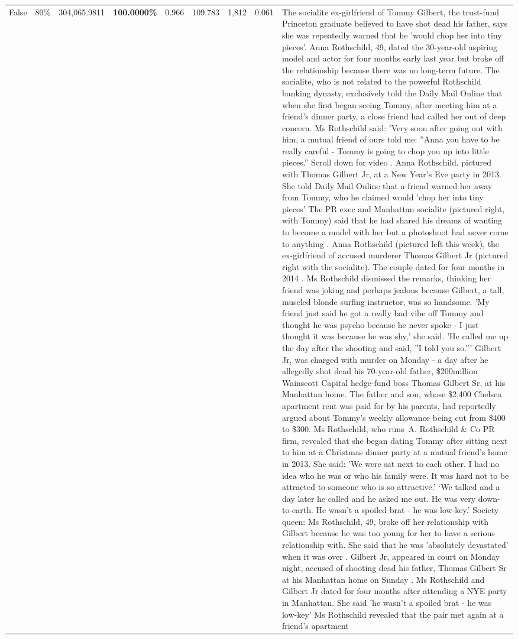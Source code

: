 \begin{table}[H]
\begin{tabular}{lllrlllll}
False & 80\% & \color{red} 304,065.9811 & \bfseries \color{red} 100.0000\% & 0.966 & 109.783 & 1,812 & 0.061 & The socialite ex-girlfriend of Tommy Gilbert, the trust-fund Princeton graduate believed to have shot dead his father, says she was repeatedly warned that he 'would chop her into tiny pieces'. Anna Rothschild, 49, dated the 30-year-old aspiring model and actor for four months early last year but broke off the relationship because there was no long-term future. The socialite, who is not related to the powerful Rothschild banking dynasty, exclusively told the Daily Mail Online that when she first began seeing Tommy, after meeting him at a friend's dinner party, a close friend had called her out of deep concern. Ms Rothschild said: 'Very soon after going out with him, a mutual friend of ours told me: ''Anna you have to be really careful - Tommy is going to chop you up into little pieces.'' Scroll down for video . Anna Rothschild, pictured with Thomas Gilbert Jr, at a New Year's Eve party in 2013. She told Daily Mail Online that a friend warned her away from Tommy, who he claimed would 'chop her into tiny pieces' The PR exec and Manhattan socialite (pictured right, with Tommy) said that he had shared his dreams of wanting to become a model with her but a photoshoot had never come to anything . Anna Rothschild (pictured left this week), the ex-girlfriend of accused murderer Thomas Gilbert Jr (pictured right with the socialite). The couple dated for four months in 2014 . Ms Rothschild dismissed the remarks, thinking her friend was joking and perhaps jealous because Gilbert, a tall, muscled blonde surfing instructor, was so handsome. 'My friend just said he got a really bad vibe off Tommy and thought he was psycho because he never spoke - I just thought it was because he was shy,' she said. 'He called me up the day after the shooting and said, ''I told you so.''' Gilbert Jr, was charged with murder on Monday - a day after he allegedly shot dead his 70-year-old father, \$200million Wainscott Capital hedge-fund boss Thomas Gilbert Sr, at his Manhattan home. The father and son, whose \$2,400 Chelsea apartment rent was paid for by his parents, had reportedly argued about Tommy's weekly allowance being cut from \$400 to \$300. Ms Rothschild, who runs A. Rothschild \& Co PR firm, revealed that she began dating Tommy after sitting next to him at a Christmas dinner party at a mutual friend's home in 2013. She said: 'We were sat next to each other. I had no idea who he was or who his family were. It was hard not to be attracted to someone who is so attractive.' ‘We talked and a day later he called and he asked me out. He was very down-to-earth. He wasn’t a spoiled brat - he was low-key.’ Society queen: Ms Rothschild, 49, broke off her relationship with Gilbert because he was too young for her to have a serious relationship with. She said that he was 'absolutely devastated' when it was over . Gilbert Jr, appeared in court on Monday night, accused of shooting dead his father, Thomas Gilbert Sr at his Manhattan home on Sunday . Ms Rothschild and Gilbert Jr dated for four months after attending a NYE party in Manhattan. She said 'he wasn't a spoiled brat - he was low-key' Ms Rothschild revealed that the pair met again at a friend’s apartment 
\end{tabular}
\end{table}

